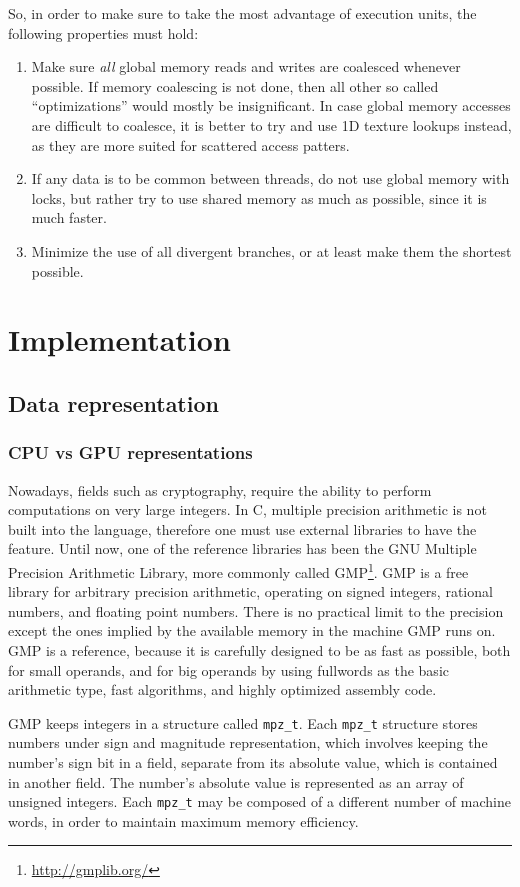 \documentclass[12pt, a4paper]{report}
\begin{document}
So, in order to make sure to take the most advantage of execution units, the
following properties must hold:

\begin{enumerate}
\item Make sure \emph{all} global memory reads and writes are coalesced whenever
possible.
If memory coalescing is not done, then all other so called ``optimizations''
would mostly be insignificant.
In case global memory accesses are difficult to coalesce, it is better to try
and use 1D texture lookups instead, as they are more suited for scattered access
patters.
\item If any data is to be common between threads, do not use global memory with
locks, but rather try to use shared memory as much as possible, since it is much
faster.
\item Minimize the use of all divergent branches, or at least make them the
shortest possible.
\end{enumerate}

\chapter{Implementation}
\section{Data representation}
\subsection{CPU vs GPU representations}
Nowadays, fields such as cryptography, require the ability to perform
computations on very large integers.
In C, multiple precision arithmetic is not built into the language, therefore
one must use external libraries to have the feature.
Until now, one of the reference libraries has been the GNU Multiple Precision
Arithmetic Library, more commonly called GMP\footnote{\url{http://gmplib.org/}}.
GMP is a free library for arbitrary precision arithmetic, operating on signed
integers, rational numbers, and floating point numbers.
There is no practical limit to the precision except the ones implied by the
available memory in the machine GMP runs on.
GMP is a reference, because it is carefully designed to be as fast as possible,
both for small operands, and for big operands by using fullwords as the basic
arithmetic type, fast algorithms, and highly optimized assembly code.

GMP keeps integers in a structure called \verb+mpz_t+.
Each \verb+mpz_t+ structure stores numbers under sign and magnitude
representation, which involves keeping the number's sign bit in a field,
separate from its absolute value, which is contained in another field.
The number's absolute value is represented as an array of unsigned integers.
Each \verb+mpz_t+ may be composed of a different number of machine words, in
order to maintain maximum memory efficiency.
\end{document}
